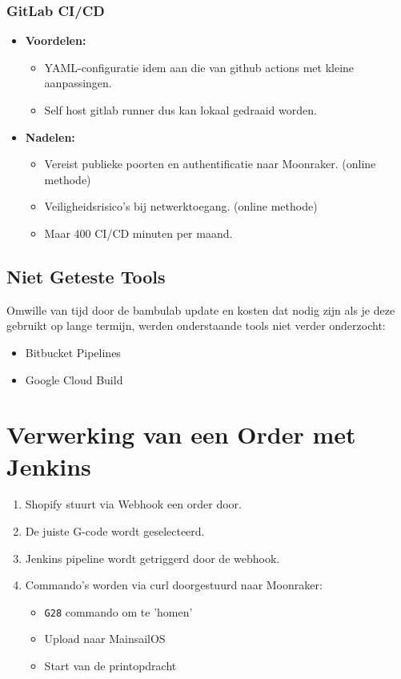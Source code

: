 \subsubsection{GitLab CI/CD}
\begin{itemize}
    \item \textbf{Voordelen:}
    \begin{itemize}
        \item YAML-configuratie idem aan die van github actions met kleine aanpassingen.
        \item Self host gitlab runner dus kan lokaal gedraaid worden.
    \end{itemize}
    \item \textbf{Nadelen:}
    \begin{itemize}
        \item Vereist publieke poorten en authentificatie naar Moonraker. (online methode)
        \item Veiligheidsrisico’s bij netwerktoegang. (online methode)
        \item Maar 400 CI/CD minuten per maand.
    \end{itemize}
\end{itemize}

\subsection{Niet Geteste Tools}
Omwille van tijd door de bambulab update en kosten dat nodig zijn als je deze gebruikt op lange termijn, werden onderstaande tools niet verder onderzocht:
\begin{itemize}
    \item Bitbucket Pipelines
    \item Google Cloud Build
\end{itemize}

\section{Verwerking van een Order met Jenkins}
\begin{enumerate}
    \item Shopify stuurt via Webhook een order door.
    \item De juiste G-code wordt geselecteerd.
    \item Jenkins pipeline wordt getriggerd door de webhook.
    \item Commando’s worden via curl doorgestuurd naar Moonraker:
    \begin{itemize}
        \item \texttt{G28} commando om te 'homen'
        \item Upload naar MainsailOS
        \item Start van de printopdracht
    \end{itemize}
\end{enumerate}

